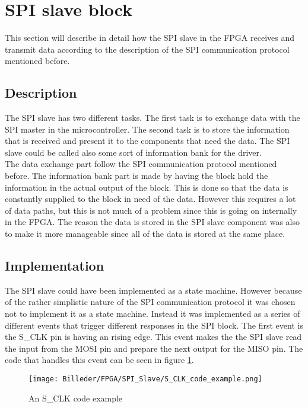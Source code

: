 \section{SPI slave block}

This section will describe in detail how the SPI slave in the FPGA receives and transmit data according to the description of the SPI communication protocol mentioned before.

\subsection{Description}

The SPI slave has two different tasks. The first task is to exchange data with the SPI master in the microcontroller. The second task is to store the information that is received and present it to the components that need the data. The SPI slave could be called also some sort of information bank for the driver.\\
The data exchange part follow the SPI communication protocol mentioned before.
The information bank part is made by having the block hold the information in the actual output of the block. This is done so that the data is constantly supplied to the block in need of the data. However this requires a lot of data paths, but this is not much of a problem since this is going on internally in the FPGA. The reason the data is stored in the SPI slave component was also to make it more manageable since all of the data is stored at the same place.

\subsection{Implementation}

The SPI slave could have been implemented as a state machine. However because of  the rather simplistic nature of the SPI communication protocol it was chosen not to implement it as a state machine. Instead it was implemented as a series of different events that trigger different responses in the SPI block. The first event is the S\_CLK pin is having an rising edge. This event makes the the SPI slave read the input from the MOSI pin and prepare the next output for the MISO pin. The code that handles this event can be seen in figure \ref{fig:S_CLK_code_example}. 

\begin{figure}[h!]
\centering
\texttt{[image: Billeder/FPGA/SPI\_Slave/S\_CLK\_code\_example.png]}
\caption{ An S\_CLK code example }
\label{fig:S_CLK_code_example}
\end{figure}

